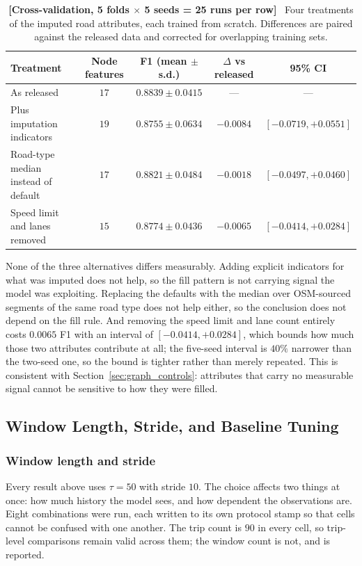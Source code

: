\documentclass[journal]{IEEEtran}
\begin{document}
\begin{table}[!t]
  \centering
  \caption{\textbf{[Cross-validation, 5 folds $\times$ 5 seeds = 25 runs per
  row]}~ Four treatments of the imputed road attributes, each trained from
  scratch. Differences are paired against the released data and corrected for
  overlapping training sets.}
  \label{tab:imputation}
  \renewcommand{\arraystretch}{1.2}
  \footnotesize
  \begin{tabular}{@{}lcccc@{}}
    \toprule
    \textbf{Treatment} & \textbf{Node features} & \textbf{F1 (mean $\pm$ s.d.)}
    & \textbf{$\Delta$ vs released} & \textbf{95\% CI} \\ \midrule
    As released & $17$ & $0.8839 \pm 0.0415$ & --- & --- \\
    Plus imputation indicators & $19$ & $0.8755 \pm 0.0634$ & $-0.0084$ & $[-0.0719, +0.0551]$ \\
    Road-type median instead of default & $17$ & $0.8821 \pm 0.0484$ & $-0.0018$ & $[-0.0497, +0.0460]$ \\
    Speed limit and lanes removed & $15$ & $0.8774 \pm 0.0436$ & $-0.0065$ & $[-0.0414, +0.0284]$ \\
    \bottomrule
  \end{tabular}
\end{table}

None of the three alternatives differs measurably. Adding explicit indicators
for what was imputed does not help, so the fill pattern is not carrying signal
the model was exploiting. Replacing the defaults with the median over
OSM-sourced segments of the same road type does not help either, so the
conclusion does not depend on the fill rule. And removing the speed limit and
lane count entirely costs $0.0065$ F1 with an interval of
$[-0.0414, +0.0284]$, which bounds how much those two attributes
contribute at all; the five-seed interval is $40\%$ narrower than the
two-seed one, so the bound is tighter rather than merely repeated. This is consistent
with Section~\ref{sec:graph_controls}: attributes that carry no measurable
signal cannot be sensitive to how they were filled.

\subsection{Window Length, Stride, and Baseline Tuning}
\label{sec:window_baseline}

\subsubsection{Window length and stride}
Every result above uses $\tau = 50$ with stride $10$. The choice affects two
things at once: how much history the model sees, and how dependent the
observations are. Eight combinations were run, each written to its own
protocol stamp so that cells cannot be confused with one another. The trip
count is $90$ in every cell, so trip-level comparisons remain valid across
them; the window count is not, and is reported.
\end{document}
